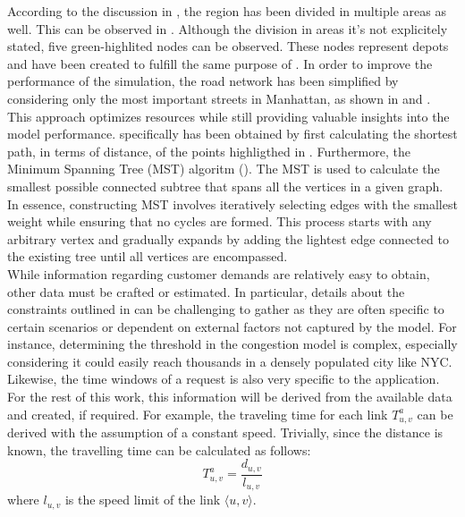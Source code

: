 According to the discussion in , the region has been divided in multiple areas as well. This can be observed in . Although the division in areas it's not explicitely stated, five green-highlited nodes can be observed. These nodes represent depots and have been created to fulfill the same purpose of .  In order to improve the performance of the simulation, the road network has been simplified by considering only the most important streets in Manhattan, as shown in  and . This approach optimizes resources while still providing valuable insights into the model performance.  specifically has been obtained by first calculating the shortest path, in terms of distance, of the points highligthed in . Furthermore, the Minimum Spanning Tree (MST) algoritm (\cite{networkx2021}). The MST is used to calculate the smallest possible connected subtree that spans all the vertices in a given graph. In essence, constructing MST involves iteratively selecting edges with the smallest weight while ensuring that no cycles are formed. This process starts with any arbitrary vertex and gradually expands by adding the lightest edge connected to the existing tree until all vertices are encompassed.\\
While information regarding customer demands are relatively easy to obtain, other data must be crafted or estimated. In particular, details about the constraints outlined in  can be challenging to gather as they are often specific to certain scenarios or dependent on external factors not captured by the model. For instance, determining the threshold in the congestion model is complex, especially considering it could easily reach thousands in a densely populated city like NYC. Likewise, the time windows of a request is also very specific to the application. For the rest of this work, this information will be derived from the available data and created, if required. For example, the traveling time for each link $T^a_{u,v}$ can be derived with the assumption of a constant speed. Trivially, since the distance is known, the travelling time can be calculated as follows: \\
\begin{equation}
	T^a_{u,v} = \dfrac{d_{u,v} }{l_{u,v}}
\end{equation}
where $l_{u,v}$ is the speed limit of the link $\langle u,v\rangle$. \\
